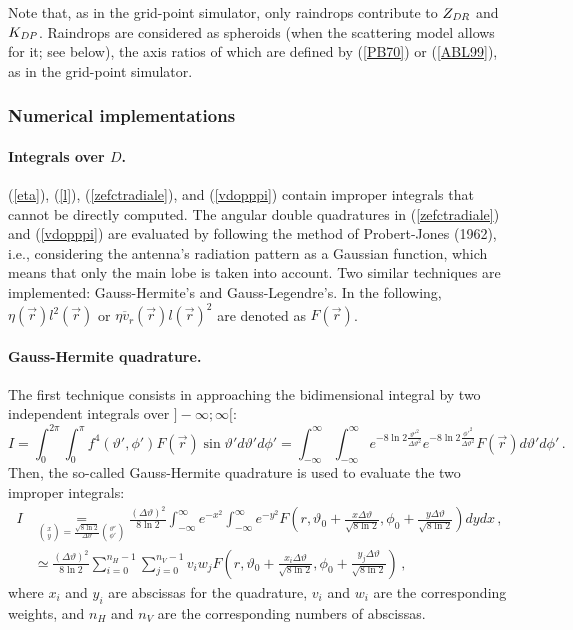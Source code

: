 Note that, as in the grid-point simulator, only raindrops contribute to $Z_{\it DR}$ and $K_{\it DP}$. Raindrops are considered as spheroids (when the scattering model allows for it; see below), the axis ratios of which are defined by (\ref{PB70}) or (\ref{ABL99}), as in the grid-point simulator.

\subsubsection{Numerical implementations}
\paragraph{Integrals over $D$.}
(\ref{eta}), (\ref{l}), (\ref{zefctradiale}), and (\ref{vdopppi}) contain improper integrals that cannot be directly computed. The angular double quadratures in (\ref{zefctradiale}) and (\ref{vdopppi}) are evaluated by following the method of Probert-Jones (1962), i.e., considering the antenna's radiation pattern as a Gaussian function, which means that only the main lobe is taken into account. Two similar techniques are implemented: Gauss-Hermite's and Gauss-Legendre's. In the following, $\eta(\vec r)l^2(\vec{r})$ or $\overline{\eta v_r}(\vec r)l(\vec r)^2$ are denoted as $F(\vec r)$.

\paragraph{Gauss-Hermite quadrature.} The first technique consists in approaching the bidimensional integral by two independent integrals over $]-\infty;\infty[$:
\begin{equation}
I=\int_0^{2\pi}\!\!\!\int_0^\pi f^4(\vartheta',\phi')F(\vec r)\sin\vartheta'd\vartheta'd\phi'=\int_{-\infty}^\infty\!\int_{-\infty}^\infty e^{-8\ln2\frac{\vartheta'^2}{\Delta\vartheta^2}}e^{-8\ln2\frac{\phi'^2}{\Delta\vartheta^2}}F(\vec r)d\vartheta'd\phi'\,.
\end{equation}
Then, the so-called Gauss-Hermite quadrature is used to evaluate the two improper integrals:
\begin{align}
I&\underset{\binom xy=\frac{\sqrt{8\ln2}}{\Delta\vartheta}\binom{\vartheta'}{\phi'}}=\frac{(\Delta\vartheta)^2}{8\ln2}\int_{-\infty}^\infty e^{-x^2}\!\int_{-\infty}^\infty e^{-y^2}F\left(r,\vartheta_0+\frac{x\Delta\vartheta}{\sqrt{8\ln2}},\phi_0+\frac{y\Delta\vartheta}{\sqrt{8\ln2}}\right)d yd x\,,\\
&\simeq\frac{(\Delta\vartheta)^2}{8\ln2}\sum_{i=0}^{n_H-1}\sum_{j=0}^{n_V-1}v_iw_jF\left(r,\vartheta_0+\frac{x_i\Delta\vartheta}{\sqrt{8\ln2}},\phi_0+\frac{y_j\Delta\vartheta}{\sqrt{8\ln2}}\right)\,,
\end{align}
where $x_i$ and $y_i$ are abscissas for the quadrature, $v_i$ and $w_i$ are the corresponding weights, and $n_H$ and $n_V$ are the corresponding numbers of abscissas. 


